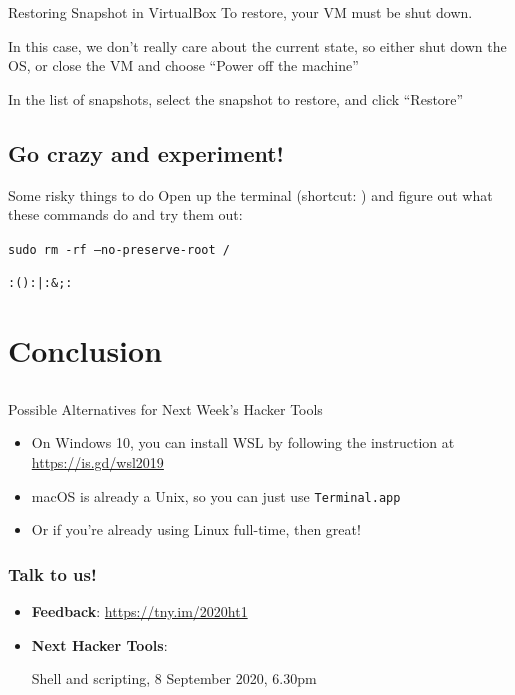 \documentclass[12pt]{beamer}
\begin{document}
\begin{frame}{Restoring Snapshot in VirtualBox}
  To restore, your VM must be shut down.

  In this case, we don't really care about the current state, so either shut down the OS, or close the VM and choose ``Power off the machine''

  In the list of snapshots, select the snapshot to restore, and click ``Restore''
\end{frame}

\subsection{Go crazy and experiment!}
\begin{frame}[fragile]{Some risky things to do}
  Open up the terminal (shortcut: ) and figure out what these commands do and try them out:

  \texttt{sudo rm -rf --no-preserve-root /}

  \texttt{:(){:|:&};:}
\end{frame}

\section{Conclusion}
\subsection{}
\begin{frame}{Possible Alternatives for Next Week's Hacker Tools}
  \begin{itemize}
    \item On Windows 10, you can install WSL by following the instruction at \url{https://is.gd/wsl2019}
    \item macOS is already a Unix, so you can just use \texttt{Terminal.app}
    \item Or if you're already using Linux full-time, then great!
  \end{itemize}
\end{frame}

\begin{frame}
  \frametitle{Talk to us!}
  \begin{itemize}
    \item \textbf{Feedback}: \url{https://tny.im/2020ht1}
    \item \textbf{Next Hacker Tools}:

          Shell and scripting, 8 September 2020, 6.30pm
  \end{itemize}
\end{frame}
\end{document}
